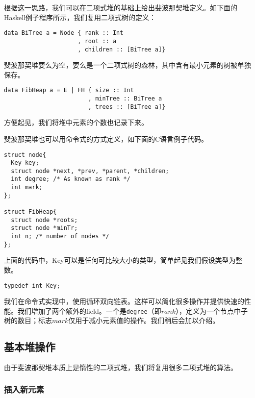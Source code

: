 \documentclass[UTF8]{article}
\begin{document}
根据这一思路，我们可以在二项式堆的基础上给出斐波那契堆定义。如下面的Haskell例子程序所示，我们复用二项式树的定义：

\lstset{language=Haskell}
\begin{lstlisting}
data BiTree a = Node { rank :: Int
                     , root :: a
                     , children :: [BiTree a]}
\end{lstlisting}

斐波那契堆要么为空，要么是一个二项式树的森林，其中含有最小元素的树被单独保存。

\begin{lstlisting}
data FibHeap a = E | FH { size :: Int
                        , minTree :: BiTree a
                        , trees :: [BiTree a]}
\end{lstlisting}

方便起见，我们将堆中元素的个数也记录下来。

斐波那契堆也可以用命令式的方式定义，如下面的C语言例子代码。

\lstset{language=C}
\begin{lstlisting}
struct node{
  Key key;
  struct node *next, *prev, *parent, *children;
  int degree; /* As known as rank */
  int mark;
};

struct FibHeap{
  struct node *roots;
  struct node *minTr;
  int n; /* number of nodes */
};
\end{lstlisting}

上面的代码中，Key可以是任何可比较大小的类型，简单起见我们假设类型为整数。

\lstset{language=C}
\begin{lstlisting}
typedef int Key;
\end{lstlisting}

我们在命令式实现中，使用循环双向链表\cite{CLRS}。这样可以简化很多操作并提供快速的性能。我们增加了两个额外的field。一个是\texttt{degree}（即$rank$），定义为一个节点中子树的数目；标志$mark$仅用于减小元素值的操作。我们稍后会加以介绍。


\subsection{基本堆操作}

由于斐波那契堆本质上是惰性的二项式堆，我们将复用很多二项式堆的算法。

\subsubsection{插入新元素}
\end{document}
